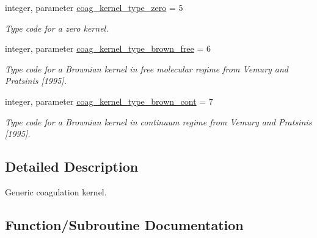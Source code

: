 \begin{DoxyCompactItemize}
integer, parameter \mbox{\hyperlink{namespacepmc__coag__kernel_a6d75eae86113c1790f98fe66147bcdcc}{coag\+\_\+kernel\+\_\+type\+\_\+zero}} = 5
\begin{DoxyCompactList}\small\item\em Type code for a zero kernel. \end{DoxyCompactList}\item 
integer, parameter \mbox{\hyperlink{namespacepmc__coag__kernel_ac11bbcea41051f4b2e16769f2a78fc94}{coag\+\_\+kernel\+\_\+type\+\_\+brown\+\_\+free}} = 6
\begin{DoxyCompactList}\small\item\em Type code for a Brownian kernel in free molecular regime from Vemury and Pratsinis \mbox{[}1995\mbox{]}. \end{DoxyCompactList}\item 
integer, parameter \mbox{\hyperlink{namespacepmc__coag__kernel_ad1ce21ef5a0a9dff8f2efe6267f22c52}{coag\+\_\+kernel\+\_\+type\+\_\+brown\+\_\+cont}} = 7
\begin{DoxyCompactList}\small\item\em Type code for a Brownian kernel in continuum regime from Vemury and Pratsinis \mbox{[}1995\mbox{]}. \end{DoxyCompactList}\end{DoxyCompactItemize}


\subsection{Detailed Description}
Generic coagulation kernel. 

\subsection{Function/\+Subroutine Documentation}
\mbox{\label{namespacepmc__coag__kernel_a8e624c7ffea2d3cb1b91778b178240da}} 
